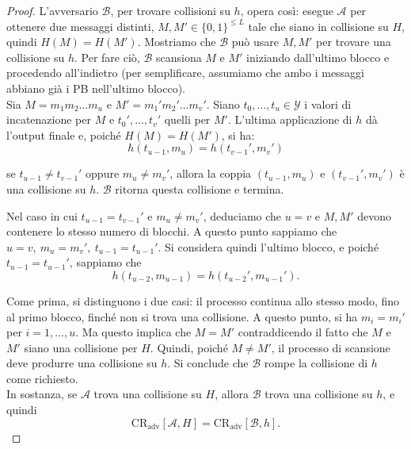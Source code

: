 \begin{proof}
    L'avversario $\mathcal{B}$, per trovare collisioni su $h$, opera così: esegue $\mathcal{A}$ per ottenere due messaggi distinti, $M,M' \in \{0,1\}^{\leq L}$ tale che siano in collisione su $H$, quindi $H(M)=H(M')$. Mostriamo che $\mathcal{B}$ può usare $M,M'$ per trovare una collisione su $h$. Per fare ciò, $\mathcal{B}$ scansiona $M$ e $M'$ iniziando dall'ultimo blocco e procedendo all'indietro (per semplificare, assumiamo che ambo i messaggi abbiano già i PB nell'ultimo blocco). \\ Sia $M=m_1m_2\dots m_u$ e $M'=m_1'm_2'\dots m_v'$. Siano $t_0, \dots, t_u \in \mathcal{Y}$ i valori di incatenazione per $M$ e $t_0', \dots, t_v' $ quelli per $M'$. L'ultima applicazione di $h$ dà l'output finale e, poiché $H(M)=H(M')$, si ha:
    \[
    h(t_{u-1},m_u)=h(t_{v-1}',m_v')
    \]

\noindent se $t_{u-1} \neq t_{v-1}'$ oppure $m_u \neq m_v'$, allora la coppia $(t_{u-1},m_u)$ e $(t_{v-1}',m_v')$ è una collisione su $h$. $\mathcal{B}$ ritorna questa collisione e termina. 

\vspace{1em}\noindent
Nel caso in cui $t_{u-1} = t_{v-1}'$ e $m_u \neq m_v'$, deduciamo che $u=v$ e $M, M'$ devono contenere lo stesso numero di blocchi. A questo punto sappiamo che $u=v, \ m_u=m_v',\  t_{u-1}=t_{u-1}'$. Si considera quindi l'ultimo blocco, e poiché $t_{u-1}=t_{u-1}'$, sappiamo che 
\[
    h(t_{u-2},m_{u-1})=h(t_{u-2}',m_{u-1}').
\]

\noindent Come prima, si distinguono i due casi: il processo continua allo stesso modo, fino al primo blocco, finché non si trova una collisione. A questo punto, si ha $m_i=m_i'$ per $i=1, \dots, u$. Ma questo implica che $M=M'$ contraddicendo il fatto che $M$ e $M'$ siano una collisione per $H$. Quindi, poiché $M \neq M'$, il processo di scansione deve produrre una collisione su $h$. Si conclude che $\mathcal{B}$ rompe la collisione di $h$ come richiesto. \\ In sostanza, se $\mathcal{A}$ trova una collisione su $H$, allora $\mathcal{B}$ trova una collisione su $h$, e quindi   \[
    \text{CR}_{\text{adv}}[\mathcal{A}, H]= \text{CR}_{\text{adv}}[\mathcal{B}, h]. 
    \]
\end{proof}

